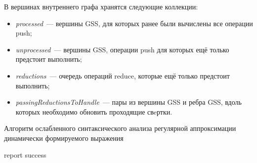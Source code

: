В вершинах внутреннего графа хранятся следующие коллекции:
\begin{itemize}
  \item \emph{processed}~--- вершины GSS, для которых ранее были вычислены все операции push;
  \item \emph{unprocessed}~--- вершины GSS, операции push для которых ещё только предстоит выполнить;
  \item \emph{reductions}~--- очередь операций reduce, которые ещё только предстоит выполнить;
  \item \emph{passingReductionsToHandle}~--- пары из вершины GSS и ребра GSS, вдоль которых необходимо обновить проходящие свeртки.
\end{itemize}


\begin{algorithm}[H]
\begin{algorithmic}[1]
\caption{Алгоритм ослабленного синтаксического анализа регулярной аппроксимации динамически формируемого выражения}
\label{parsing}
    {report success}
    \EndIf
  \Else
    \EndWhile
    \EndIf
  \EndIf
\EndFunction
\end{algorithmic}
\end{algorithm}


